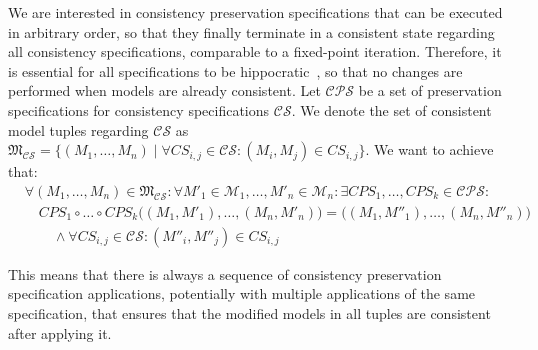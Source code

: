 We are interested in consistency preservation specifications that can be executed in arbitrary order, so that they finally terminate in a consistent state regarding all consistency specifications, comparable to a fixed-point iteration.
Therefore, it is essential for all specifications to be hippocratic~\cite{stevens2010sosym}, so that no changes are performed when models are already consistent.
Let $\mathcal{CPS}$ be a set of preservation specifications %
for consistency specifications $\mathcal{CS}$. %
We denote the set of consistent model tuples regarding $\mathcal{CS}$ as $\mathfrak{M}_{\mathcal{CS}} = \{(M_1, \dots, M_n) \mid %
\forall \mathit{CS}_{i,j} \in \mathcal{CS} : (M_i, M_j) \in \mathit{CS}_{i, j}\}$.
We want to achieve that:
\begin{align*}
    & \forall (M_1, \dots, M_n) \in \mathfrak{M}_{\mathcal{CS}} : %
    \forall M'_1 \in \mathcal{M}_1, \dots, M'_n \in \mathcal{M}_n : \exists \mathit{CPS}_1, \dots, \mathit{CPS}_k \in \mathcal{CPS} : \\
    & \hspace{1em} \mathit{CPS}_1 \circ \dots \circ \mathit{CPS}_k \big( (M_1, M'_1), \dots, (M_n, M'_n) \big) = \big( (M_1, M''_1), \dots, (M_n, M''_n) \big) \\
    & \hspace{2em} \land \forall \mathit{CS}_{i,j} \in \mathcal{CS} : (M''_i, M''_j) \in \mathit{CS}_{i, j} %
\end{align*}

This means that there is always a sequence of consistency preservation specification applications, potentially with multiple applications of the same specification, that ensures that the modified models in all tuples are consistent after applying it.

